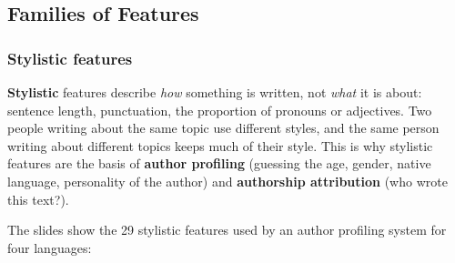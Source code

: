 \subsection{Families of Features}
\label{sec:feature-types}

\subsubsection{Stylistic features}

\textbf{Stylistic} features describe \emph{how} something is written, not \emph{what}
it is about: sentence length, punctuation, the proportion of pronouns or adjectives.
Two people writing about the same topic use different styles, and the same person
writing about different topics keeps much of their style. This is why stylistic
features are the basis of \textbf{author profiling} (guessing the age, gender, native
language, personality of the author) and \textbf{authorship attribution} (who wrote this
text?).

The slides show the 29 stylistic features used by an author profiling system for four
languages:

